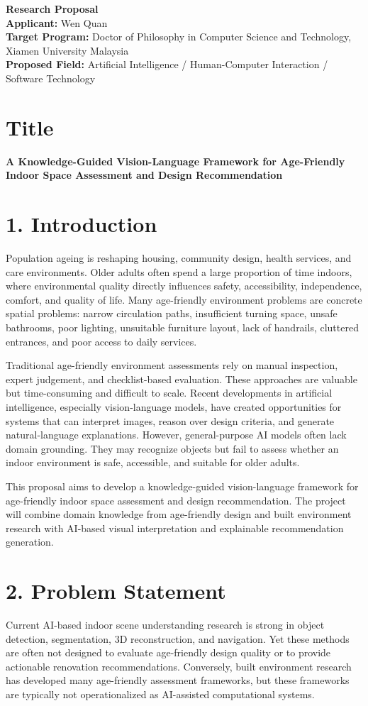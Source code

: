 \documentclass[11pt,a4paper]{article}
\begin{document}
{\LARGE \textbf{Research Proposal}}\\
\textbf{Applicant:} Wen Quan\\
\textbf{Target Program:} Doctor of Philosophy in Computer Science and Technology, Xiamen University Malaysia\\
\textbf{Proposed Field:} Artificial Intelligence / Human-Computer Interaction / Software Technology

\section*{Title}
\textbf{A Knowledge-Guided Vision-Language Framework for Age-Friendly Indoor Space Assessment and Design Recommendation}

\section*{1. Introduction}
Population ageing is reshaping housing, community design, health services, and care environments. Older adults often spend a large proportion of time indoors, where environmental quality directly influences safety, accessibility, independence, comfort, and quality of life. Many age-friendly environment problems are concrete spatial problems: narrow circulation paths, insufficient turning space, unsafe bathrooms, poor lighting, unsuitable furniture layout, lack of handrails, cluttered entrances, and poor access to daily services.

Traditional age-friendly environment assessments rely on manual inspection, expert judgement, and checklist-based evaluation. These approaches are valuable but time-consuming and difficult to scale. Recent developments in artificial intelligence, especially vision-language models, have created opportunities for systems that can interpret images, reason over design criteria, and generate natural-language explanations. However, general-purpose AI models often lack domain grounding. They may recognize objects but fail to assess whether an indoor environment is safe, accessible, and suitable for older adults.

This proposal aims to develop a knowledge-guided vision-language framework for age-friendly indoor space assessment and design recommendation. The project will combine domain knowledge from age-friendly design and built environment research with AI-based visual interpretation and explainable recommendation generation.

\section*{2. Problem Statement}
Current AI-based indoor scene understanding research is strong in object detection, segmentation, 3D reconstruction, and navigation. Yet these methods are often not designed to evaluate age-friendly design quality or to provide actionable renovation recommendations. Conversely, built environment research has developed many age-friendly assessment frameworks, but these frameworks are typically not operationalized as AI-assisted computational systems.
\end{document}
